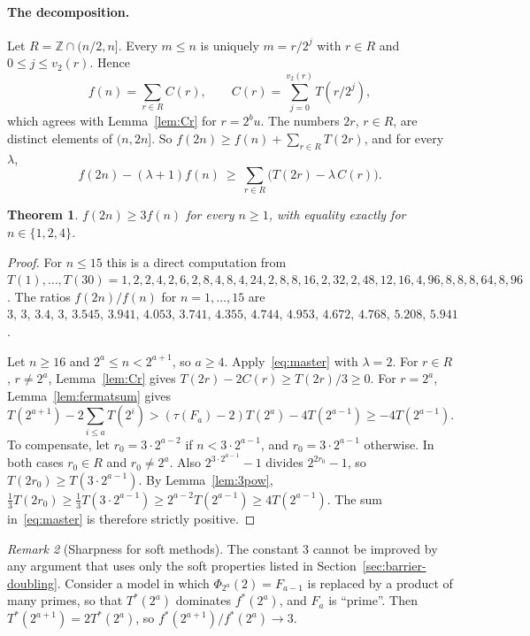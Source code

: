 \documentclass[11pt]{amsart}
\newtheorem{theorem}{Theorem}[section]
\theoremstyle{definition}
\theoremstyle{remark}
\newtheorem{remark}[theorem]{Remark}
\newcommand{\Z}{\mathbb{Z}}
\begin{document}
\paragraph{The decomposition.}
Let $R=\Z\cap(n/2,n]$. Every $m\le n$ is uniquely $m=r/2^j$ with $r\in R$ and $0\le j\le v_2(r)$. Hence
\begin{equation}\label{eq:decomp}
f(n)=\sum_{r\in R}C(r),\qquad C(r)=\sum_{j=0}^{v_2(r)}T(r/2^j),
\end{equation}
which agrees with Lemma~\ref{lem:Cr} for $r=2^bu$. The numbers $2r$, $r\in R$, are distinct elements of $(n,2n]$.
So $f(2n)\ge f(n)+\sum_{r\in R}T(2r)$, and for every $\lambda$,
\begin{equation}\label{eq:master}
f(2n)-(\lambda+1)f(n)\ \ge\ \sum_{r\in R}\bigl(T(2r)-\lambda\,C(r)\bigr).
\end{equation}

\begin{theorem}\label{thm:three}
$f(2n)\ge3f(n)$ for every $n\ge1$, with equality exactly for $n\in\{1,2,4\}$.
\end{theorem}
\begin{proof}
For $n\le15$ this is a direct computation from
$T(1),\dots,T(30)=1,2,2,4,2,6,2,8,4,8,4,24,2,8,8,16,2,32,2,48,12,16,4,96,8,8,8,64,8,96$.
The ratios $f(2n)/f(n)$ for $n=1,\dots,15$ are
$3,\,3,\,3.4,\,3,\,3.545,\,3.941,\,4.053,\,3.741,\,4.355,\,4.744,\,4.953,\,4.672,\,4.768,\,5.208,\,5.941$.

Let $n\ge16$ and $2^a\le n<2^{a+1}$, so $a\ge4$. Apply~\eqref{eq:master} with $\lambda=2$. For $r\in R$, $r\ne2^a$,
Lemma~\ref{lem:Cr} gives $T(2r)-2C(r)\ge T(2r)/3\ge0$. For $r=2^a$, Lemma~\ref{lem:fermatsum} gives
\[
T(2^{a+1})-2\sum_{i\le a}T(2^i)>(\tau(F_a)-2)T(2^a)-4T(2^{a-1})\ge-4T(2^{a-1}).
\]
To compensate, let $r_0=3\cdot2^{a-2}$ if $n<3\cdot2^{a-1}$, and $r_0=3\cdot2^{a-1}$ otherwise. In both cases
$r_0\in R$ and $r_0\ne2^a$. Also $2^{3\cdot2^{a-1}}-1$ divides $2^{2r_0}-1$, so
$T(2r_0)\ge T(3\cdot2^{a-1})$. By Lemma~\ref{lem:3pow},
$\tfrac13T(2r_0)\ge\tfrac13T(3\cdot 2^{a-1})\ge2^{a-2}T(2^{a-1})\ge4T(2^{a-1})$.
The sum in~\eqref{eq:master} is therefore strictly positive.
\end{proof}

\begin{remark}[Sharpness for soft methods]\label{rem:sharp3}
The constant $3$ cannot be improved by any argument that uses only the soft properties listed in
Section~\ref{sec:barrier-doubling}. Consider a model in which $\Phi_{2^a}(2)=F_{a-1}$ is replaced by a product of
many primes, so that $T^*(2^a)$ dominates $f^*(2^a)$, and $F_a$ is ``prime''. Then
$T^*(2^{a+1})=2T^*(2^a)$, so $f^*(2^{a+1})/f^*(2^a)\to3$.
\end{remark}
\end{document}
